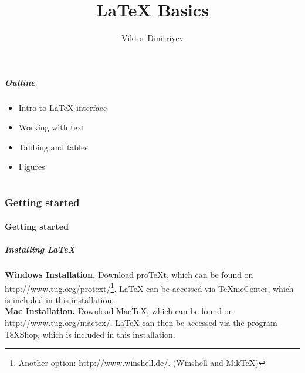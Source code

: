 \documentclass[slidestop,compress,mathserif]{beamer}
\title{LaTeX Basics}
\subtitle{}
\author{Viktor Dmitriyev}
\institute{Adapter from Mini Course on LaTeX by \href{https://github.com/OpenIntroOrg/mini-course-materials}{David Diez}}
\date{}
\begin{document}
\newenvironment{act}[1]{{\color{command}#1}}{}


\frame{ \titlepage }

\begin{frame}
  \frametitle{Outline}
  \begin{itemize}
  \item Intro to LaTeX interface
  \item Working with text
  \item Tabbing and tables
  \item Figures
  \end{itemize}
\end{frame}

\part{}

\section[Getting started]{Getting started}
\subsection[Getting started]{Getting started}

\begin{frame} \frametitle{Installing LaTeX}
	
	{\bf Windows Installation. } Download proTeXt, which can be found on {\color{highlight}http://www.tug.org/protext/}\footnote{Another option: {\color{highlight}http://www.winshell.de/}. (Winshell and MikTeX)}. LaTeX can be accessed via TeXnicCenter, which is included in this installation. \\
	
	{\bf Mac Installation. } Download MacTeX, which can be found on {\color{highlight}http://www.tug.org/mactex/}. LaTeX can then be accessed via the program TeXShop, which is included in this installation. \\
	\vspace{0.5cm}

\end{frame}
\end{document}
